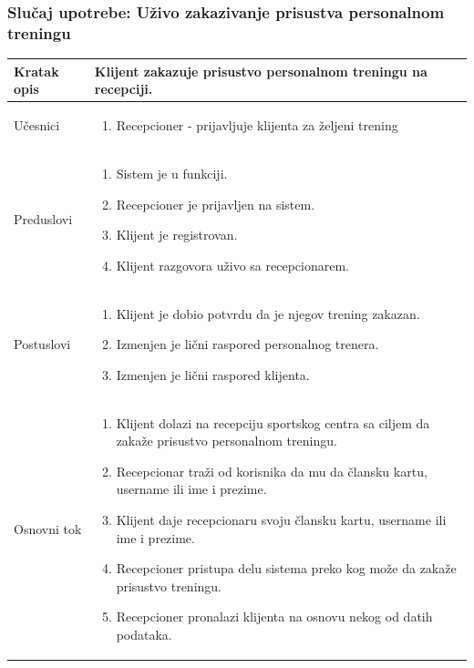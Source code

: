 \subsubsection{Slučaj upotrebe: Uživo zakazivanje prisustva personalnom treningu}

\begin{longtable}{| p{} | p{} |} 
\hline
    Kratak opis & Klijent zakazuje prisustvo personalnom treningu na recepciji. \\ 
\hline    
    Učesnici & 
    \begin{enumerate}
    \item Recepcioner - prijavljuje klijenta za željeni trening
   \end{enumerate}\\
\hline
   Preduslovi & \begin{enumerate}
    \item Sistem je u funkciji.
    \item Recepcioner je prijavljen na sistem.
    \item Klijent je registrovan.
    \item Klijent razgovora uživo sa recepcionarem.
   \end{enumerate} \\
\hline  
    Postuslovi & \begin{enumerate}
    \item Klijent je dobio potvrdu da je njegov trening zakazan.
    \item Izmenjen je lični raspored personalnog trenera.
    \item Izmenjen je lični raspored klijenta.
   \end{enumerate} \\
\hline
    Osnovni tok & 
    \begin{enumerate}
    \item Klijent dolazi na recepciju sportskog centra sa ciljem da zakaže prisustvo personalnom treningu.
    \item Recepcionar traži od korisnika da mu da člansku kartu, username ili ime i prezime.
    \item Klijent daje recepcionaru svoju člansku kartu, username ili ime i prezime.
    \item Recepcioner pristupa delu sistema preko kog može da zakaže prisustvo treningu.
    \item Recepcioner pronalazi klijenta na osnovu nekog od datih podataka.

\end{enumerate}
\end{longtable}

